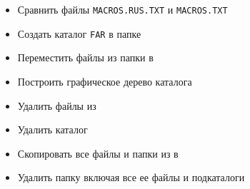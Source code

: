 \documentclass[a4paper,12pt]{article}
\begin{document}
\begin{flushleft}
\begin{enumerate}
\begin{itemize}
                \item Сравнить файлы \texttt{MACROS.RUS.TXT} и \texttt{MACROS.TXT}
                \item Создать каталог \texttt{FAR} в папке 
                \item Переместить файлы из папки  в 
                \item Построить графическое дерево каталога 
                \item Удалить файлы из 
                \item Удалить каталог 
                \item Скопировать все файлы и папки из  в 
                \item Удалить папку  включая все ее файлы и подкаталоги
            \end{itemize}
        \end{enumerate}
    \end{flushleft}
\end{document}
